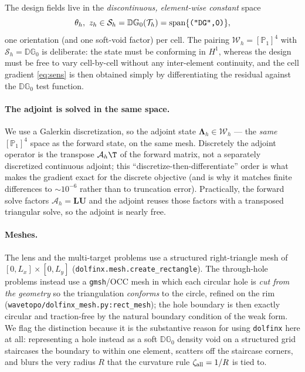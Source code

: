 \documentclass[11pt]{article}
\begin{document}
The design fields live in the \emph{discontinuous, element-wise constant} space
\begin{equation}
  \theta_h,\ z_h\in\mathcal S_h=\mathbb{DG}_0(\mathcal T_h)
  =\operatorname{span}\{\text{\texttt{("DG",0)}}\},
\end{equation}
one orientation (and one soft-void factor) per cell. The pairing
$\mathcal W_h=[\mathbb P_1]^4$ with $\mathcal S_h=\mathbb{DG}_0$ is deliberate:
the state must be conforming in $H^1$, whereas the design must be free to vary
cell-by-cell without any inter-element continuity, and the cell gradient
\eqref{eq:sens} is then obtained simply by differentiating the residual against
the $\mathbb{DG}_0$ test function.

\paragraph{The adjoint is solved in the same space.} We use a Galerkin
discretization, so the adjoint state
$\bm\Lambda_h\in\mathcal W_h$ --- the \emph{same} $[\mathbb P_1]^4$ space as the
forward state, on the same mesh. Discretely the adjoint operator is the transpose
$\mathcal A_h\T$ of the forward matrix, not a separately discretized continuous
adjoint; this ``discretize-then-differentiate'' order is what makes the gradient
exact for the discrete objective (and is why it matches finite differences to
$\sim\!10^{-6}$ rather than to truncation error). Practically, the forward solve
factors $\mathcal A_h=\mathbf{LU}$ and the adjoint reuses those factors with a
transposed triangular solve, so the adjoint is nearly free.

\paragraph{Meshes.} The lens and the multi-target problems use a structured
right-triangle mesh of $[0,L_x]\times[0,L_y]$
(\texttt{dolfinx.mesh.create\_rectangle}). The through-hole problems instead use a
\texttt{gmsh}/OCC mesh in which each circular hole is \emph{cut from the geometry}
so the triangulation \emph{conforms} to the circle, refined on the rim
(\texttt{wavetopo/dolfinx\_mesh.py:rect\_mesh}); the hole boundary is then exactly
circular and traction-free by the natural boundary condition of the weak form. We
flag the distinction because it is the substantive reason for using
\texttt{dolfinx} here at all: representing a hole instead as a soft
$\mathbb{DG}_0$ density void on a structured grid staircases the boundary to
within one element, scatters off the staircase corners, and blurs the very radius
$R$ that the curvature rule $\zeta_{\rm all}=1/R$ is tied to.
\end{document}
